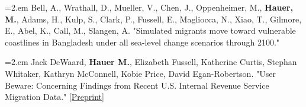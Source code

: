  \hangindent=2.em Bell, A., Wrathall, D., Mueller, V., Chen, J., Oppenheimer, M., \textbf{Hauer, M.}, Adams, H., Kulp, S., Clark, P., Fussell, E., Magliocca, N., Xiao, T., Gilmore, E., Abel, K., Call, M., Slangen, A. "Simulated migrants move toward vulnerable coastlines in Bangladesh under all sea-level change scenarios through 2100."

       \hangindent=2.em Jack DeWaard, \textbf{Hauer M.}, Elizabeth Fussell, Katherine Curtis, Stephan Whitaker, Kathryn McConnell, Kobie Price, David Egan-Robertson. "User Beware: Concerning Findings from Recent U.S. Internal Revenue Service Migration Data." \href{https://assets.ipums.org/_files/mpc/wp2020-02.pdf}{[Preprint]}\\

%



%
%








